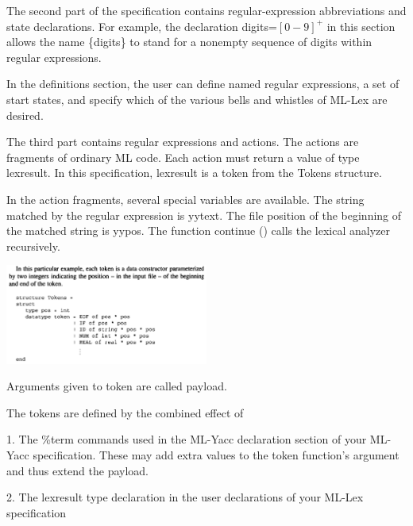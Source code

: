 \documentclass[8pt, a4paper, oneside, twocolumn]{extarticle}
\begin{document}
The second part of the specification contains regular-expression  
abbreviations and state declarations. For example, the declaration digits=$[0-9]^+$ 
in this section allows the name \{digits\} to stand for a nonempty sequence 
of digits within regular expressions. 

In the definitions section, the user can define named regular expressions, a set of start states, and specify which of the various bells and whistles of ML-Lex are desired.

The third part contains regular expressions and actions. The actions are 
fragments of ordinary ML code. Each action must return a value of type 
lexresult. In this specification, lexresult is a token from the Tokens 
structure. 

In the action fragments, several special variables are available. The string 
matched by the regular expression is yytext. The file position of the  
beginning of the matched string is yypos. The function continue () calls the 
lexical analyzer recursively. 

\includegraphics[width=0.5\textwidth,height=0.5\textheight,keepaspectratio]{lex2}

Arguments given to token are called payload.

The tokens are defined by the combined effect of

1. The \%term commands used in the ML-Yacc declaration section of your ML-Yacc
specification. These may add extra values to the token function’s argument and
thus extend the payload.

2. The lexresult type declaration in the user declarations of your ML-Lex specification
\end{document}
